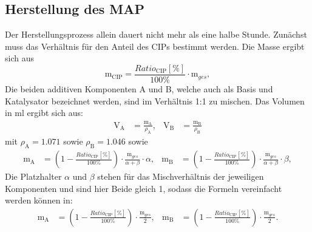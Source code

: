 \subsection{Herstellung des MAP} \label{Herstellung_MAP} \FloatBarrier
Der Herstellungsprozess allein dauert nicht mehr als eine halbe Stunde. Zunächst muss das Verhältnis für den Anteil des CIPs bestimmt werden. Die Masse ergibt sich aus
\begin{equation}
\text{m}_{\text{CIP}} = \frac{Ratio_{\text{CIP}} [\%]}{100\%}\cdot\text{m}_{ges},
\end{equation}
Die beiden additiven Komponenten A und B, welche auch als Basis und Katalysator bezeichnet werden, sind im Verhältnis 1:1 zu mischen. Das Volumen in \unit{ml} ergibt sich aus:
\begin{align}
\text{V}_\text{A} &= \frac{\text{m}_\text{A}}{\rho_\text{A}} ,& 
\text{V}_\text{B} &= \frac{\text{m}_\text{B}}{\rho_\text{B}}
\end{align}
mit $\rho_\text{A} = 1.071$ sowie $\rho_\text{B} = 1.046$ sowie
\begin{align}	
\text{m}_\text{A} &= \left( 1- \frac{Ratio_{\text{CIP}} [\%]}{100\%}\right)\cdot
\frac{\text{m}_{ges}}{\alpha + \beta}\cdot\alpha ,&
\text{m}_\text{B} &= \left( 1- \frac{Ratio_{\text{CIP}} [\%]}{100\%}\right)\cdot
\frac{\text{m}_{ges}}{\alpha + \beta}\cdot\beta,
\end{align}
Die Platzhalter $\alpha$ und $\beta$ stehen für das Mischverhältnis der jeweiligen Komponenten und sind hier Beide gleich 1, sodass die Formeln vereinfacht werden können in:
\begin{align}	
\text{m}_\text{A} &= \left( 1- \frac{Ratio_{\text{CIP}} [\%]}{100\%}\right)\cdot
\frac{\text{m}_{ges}}{2} ,&
\text{m}_\text{B} &= \left( 1- \frac{Ratio_{\text{CIP}} [\%]}{100\%}\right)\cdot
\frac{\text{m}_{ges}}{2}.
\end{align}

